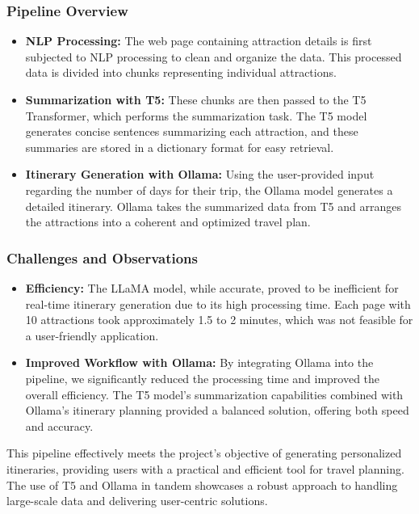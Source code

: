 \documentclass[conference]{IEEEtran}
\begin{document}
        \subsubsection{Pipeline Overview}
            \begin{itemize}
                \item \textbf{NLP Processing:} The web page containing attraction details is first subjected to NLP processing to clean and organize the data. This processed data is divided into chunks representing individual attractions.
                \item \textbf{Summarization with T5:} These chunks are then passed to the T5 Transformer, which performs the summarization task. The T5 model generates concise sentences summarizing each attraction, and these summaries are stored in a dictionary format for easy retrieval.
                \item \textbf{Itinerary Generation with Ollama:} Using the user-provided input regarding the number of days for their trip, the Ollama model generates a detailed itinerary. Ollama takes the summarized data from T5 and arranges the attractions into a coherent and optimized travel plan.
            \end{itemize}

        \subsubsection{Challenges and Observations}
            \begin{itemize}
                \item \textbf{Efficiency:} The LLaMA model, while accurate, proved to be inefficient for real-time itinerary generation due to its high processing time. Each page with 10 attractions took approximately 1.5 to 2 minutes, which was not feasible for a user-friendly application.
                \item \textbf{Improved Workflow with Ollama:} By integrating Ollama into the pipeline, we significantly reduced the processing time and improved the overall efficiency. The T5 model's summarization capabilities combined with Ollama's itinerary planning provided a balanced solution, offering both speed and accuracy.
            \end{itemize}

        This pipeline effectively meets the project's objective of generating personalized itineraries, providing users with a practical and efficient tool for travel planning. The use of T5 and Ollama in tandem showcases a robust approach to handling large-scale data and delivering user-centric solutions.
\end{document}
